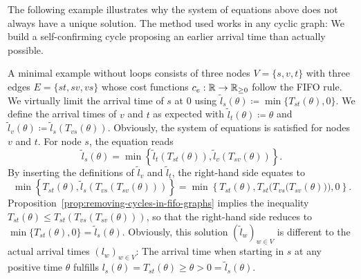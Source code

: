 The following example illustrates why the system of equations above does not always have a unique solution.
The method used works in any cyclic graph: We build a self-confirming cycle proposing an earlier arrival time than actually possible.
\begin{example}
    A minimal example without loops consists of three nodes $V=\{ s, v, t \}$ with three edges $E=\{ st, sv, vs \}$ whose cost functions $c_e: \mathbb{R} \rightarrow \mathbb{R}_{\geq 0}$ follow the FIFO rule.
    We virtually limit the arrival time of $s$ at $0$ using $\tilde l_s (\theta) \coloneqq \min\{ T_{st}(\theta), 0 \}$.
    We define the arrival times of $v$ and $t$ as expected with $\tilde l_t(\theta) \coloneqq \theta$ and $\tilde l_v(\theta) \coloneqq \tilde l_s(T_{vs}(\theta))$.
    Obviously, the system of equations is satisfied for nodes $v$ and $t$.
    For node $s$, the equation reads \[
        \tilde l_s(\theta) = \min\left\{ \tilde l_t(T_{st}(\theta)), \tilde l_v(T_{sv}(\theta)) \right\}. 
    \]
    By inserting the definitions of $\tilde l_v$ and $\tilde l_t$, the right-hand side equates to \[
        \min\left\{ T_{st}(\theta), \tilde l_s(T_{vs}(T_{sv}(\theta))) \right\}
        = \min \left\{ T_{st}(\theta), T_{st} \Big( T_{vs}\big(T_{sv}(\theta)\big) \Big), 0 \right\}.
    \]
    Proposition~\ref{prop:removing-cycles-in-fifo-graphs} implies the inequality $T_{st}(\theta) \leq T_{st} ( T_{vs}(T_{sv}(\theta)))$, so that the right-hand side reduces to $\min\{ T_{st}(\theta), 0 \} = \tilde l_s(\theta)$.
    Obviously, this solution $(\tilde l_w)_{w\in V}$ is different to the actual arrival times $(l_w)_{w\in V}$: The arrival time when starting in $s$ at any positive time $\theta$ fulfills $l_s(\theta) = T_{st}(\theta) \geq \theta > 0 = \tilde l_s(\theta)$.
\end{example}